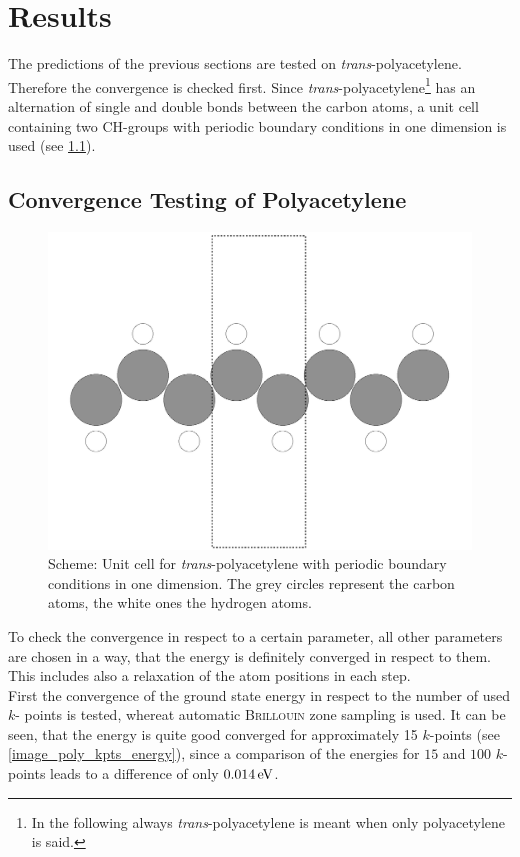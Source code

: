 \chapter{Results}

The predictions of the previous sections are tested on \emph{trans}-polyacetylene. Therefore the convergence is checked first. Since \emph{trans}-polyacetylene\footnote{In the following always \emph{trans}-polyacetylene is meant when only polyacetylene is said.} has an alternation of single and double bonds between the carbon atoms, a unit cell containing two CH-groups with periodic boundary conditions in one dimension is used (see \cref{image_scheme_polyacetylene_unit_cell}). 

\section{Convergence Testing of Polyacetylene}
\begin{figure}[]
	\centering
	\includegraphics[width = .5\textwidth]{Images/polyacetylene/convergence/polyacetylene_nice_unit_cell}
	\caption{Scheme: Unit cell for \emph{trans}-polyacetylene with periodic boundary conditions in one dimension. The grey circles represent the carbon atoms, the white ones the hydrogen atoms.}
	\label{image_scheme_polyacetylene_unit_cell}
\end{figure}
To check the convergence in respect to a certain parameter, all other parameters are chosen in a way, that the energy is definitely converged in respect to them. This includes also a relaxation of the atom positions in each step.\\
First the convergence of the ground state energy in respect to the number of used $k$- points is tested, whereat automatic \textsc{Brillouin} zone sampling is used. It can be seen, that the energy is quite good converged for approximately 15 $k$-points (see \cref{image_poly_kpts_energy}), since a comparison of the energies for $15$ and $100$ $k$-points leads to a difference of only $\unit[0.014]{eV}$.\\
